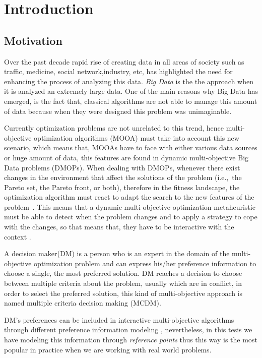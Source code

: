 \chapter{Introduction}
\label{chapter:introduction}

\section{Motivation}
Over the past decade rapid rise of creating data in all areas of society such as traffic, medicine, social network,industry, etc, has highlighted the need for enhancing the process of analyzing this data. \textit{Big Data} is the the approach when it is analyzed an extremely large data. One of the main reasons why Big Data has emerged, is the fact that, classical algorithms are not able to manage this amount of data because when they were designed this problem was unimaginable.

Currently optimization problems are not unrelated to this trend, hence multi-objective optimization algorithms (MOOA) must take into account this new scenario, which means that,  MOOAs have to face with either various data sources or huge amount of data, this features are found in dynamic multi-objective Big Data problems (DMOPs).
When dealing with DMOPs, whenever there exist changes in the environment that affect the solutions of the problem (i.e.,\ the Pareto set, the Pareto front, or both), therefore in the fitness landscape, the optimization algorithm must react to adapt the search to the new features of the problem~\cite{FDA04}. This means that a dynamic multi-objective optimization metaheuristic must be able to detect when the problem changes and to apply a strategy to cope with the changes, so that means that, they have to be interactive with the context \cite{lopez2015machine}.

A decision maker(DM) is a person who is an expert in the domain of the multi-objective optimization problem and can express his/her preference information to choose a single, the most preferred solution.
DM reaches a decision to choose between multiple criteria about the problem, usually which are in conflict, in order to select the preferred solution, this kind of multi-objective approach is named multiple criteria decision making (MCDM).

DM's preferences can be included in interactive multi-objective algorithms through different preference information modeling \cite{greco2005multiple} \cite{purshouse2014review}, nevertheless, in this tesis we have modeling this information through \textit{reference points} thus this way is the most popular in practice when we are working with real world problems.

